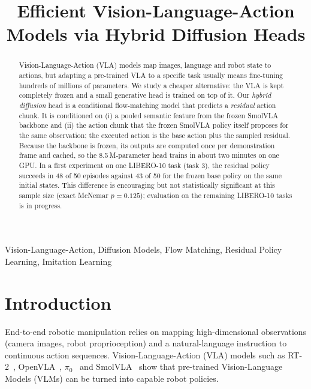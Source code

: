 \documentclass[conference]{IEEEtran}
\begin{document}
\title{Efficient Vision-Language-Action Models via Hybrid Diffusion Heads\\
}

\author{
}

\maketitle

\begin{abstract}
Vision-Language-Action (VLA) models map images, language and robot state to actions, but adapting a pre-trained VLA to a specific task usually means fine-tuning hundreds of millions of parameters. We study a cheaper alternative: the VLA is kept completely frozen and a small generative head is trained on top of it. Our \emph{hybrid diffusion} head is a conditional flow-matching model that predicts a \emph{residual} action chunk. It is conditioned on (i) a pooled semantic feature from the frozen SmolVLA backbone and (ii) the action chunk that the frozen SmolVLA policy itself proposes for the same observation; the executed action is the base action plus the sampled residual. Because the backbone is frozen, its outputs are computed once per demonstration frame and cached, so the 8.5\,M-parameter head trains in about two minutes on one GPU. In a first experiment on one LIBERO-10 task (task 3), the residual policy succeeds in 48 of 50 episodes against 43 of 50 for the frozen base policy on the same initial states. This difference is encouraging but not statistically significant at this sample size (exact McNemar $p=0.125$); evaluation on the remaining LIBERO-10 tasks is in progress.
\end{abstract}

\begin{IEEEkeywords}
Vision-Language-Action, Diffusion Models, Flow Matching, Residual Policy Learning, Imitation Learning
\end{IEEEkeywords}

\section{Introduction}
End-to-end robotic manipulation relies on mapping high-dimensional observations (camera images, robot proprioception) and a natural-language instruction to continuous action sequences. Vision-Language-Action (VLA) models such as RT-2~\cite{rt2}, OpenVLA~\cite{openvla}, $\pi_0$~\cite{pi0} and SmolVLA~\cite{smolvla} show that pre-trained Vision-Language Models (VLMs) can be turned into capable robot policies.
\end{document}
